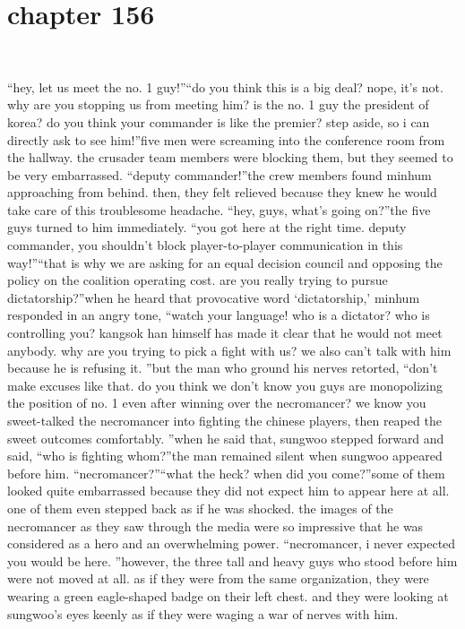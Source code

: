 \section{chapter 156}

                             




“hey, let us meet the no.
 1 guy!”“do you think this is a big deal? nope, it’s not.
 why are you stopping us from meeting him? is the no.
 1 guy the president of korea? do you think your commander is like the premier? step aside, so i can directly ask to see him!”five men were screaming into the conference room from the hallway.
 the crusader team members were blocking them, but they seemed to be very embarrassed.
“deputy commander!”the crew members found minhum approaching from behind.
 then, they felt relieved because they knew he would take care of this troublesome headache.
“hey, guys, what’s going on?”the five guys turned to him immediately.
“you got here at the right time.
 deputy commander, you shouldn’t block player-to-player communication in this way!”“that is why we are asking for an equal decision council and opposing the policy on the coalition operating cost.
 are you really trying to pursue dictatorship?”when he heard that provocative word ‘dictatorship,’ minhum responded in an angry tone, “watch your language! who is a dictator? who is controlling you? kangsok han himself has made it clear that he would not meet anybody.
 why are you trying to pick a fight with us? we also can’t talk with him because he is refusing it.
”but the man who ground his nerves retorted, “don’t make excuses like that.
 do you think we don’t know you guys are monopolizing the position of no.
 1 even after winning over the necromancer? we know you sweet-talked the necromancer into fighting the chinese players, then reaped the sweet outcomes comfortably.
”when he said that, sungwoo stepped forward and said, “who is fighting whom?”the man remained silent when sungwoo appeared before him.
“necromancer?”“what the heck? when did you come?”some of them looked quite embarrassed because they did not expect him to appear here at all.
 one of them even stepped back as if he was shocked.
the images of the necromancer as they saw through the media were so impressive that he was considered as a hero and an overwhelming power.
“necromancer, i never expected you would be here.
”however, the three tall and heavy guys who stood before him were not moved at all.
as if they were from the same organization, they were wearing a green eagle-shaped badge on their left chest.
 and they were looking at sungwoo’s eyes keenly as if they were waging a war of nerves with him.

